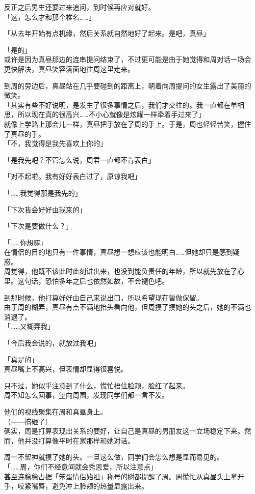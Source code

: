 反正之后男生还要过来追问，到时候再应对就好。\\

「这，怎么才和那个椎名……」

「从去年开始有点机缘，然后关系就自然地好了起来。是吧，真昼」

「是的」\\

或许是因为真昼那边的连串提问结束了，不过更可能是由于她觉得和周对话一场会更快解决，真昼笑容满面地往周这里走来。

到周的旁边后，真昼站在几乎要碰到的距离上，朝着向周提问的女生露出了美丽的微笑。\\

「其实有些不好说明，是发生了很多事情之后，我们才交往的。我一直都在单相思，所以现在真的很高兴……不小心就像是炫耀一样牵着手过来了」\\

就像上学路上那会儿一样，真昼把手放在了周的手上。于是，周也轻轻苦笑，握住了真昼的手。\\

「不，我觉得是我先喜欢上你的」

「是我先吧？不管怎么说，周君一直都不肯表白」

「对不起啦。我有好好表白过了，原谅我吧」

「……我觉得那是我先的」

「下次我会好好由我来的」

「下次是要做什么？」

「……你想嘛」\\

在情侣的目的地只有一件事情，真昼想一想应该也能明白……但她却只是感到疑惑。\\

周觉得，他既不该此时此刻讲出来，也没到能负责任的年龄，所以就先放在了心里。这句话，恐怕多年之后也依然如故，不会褪色吧。

到那时候，他打算好好由自己来说出口，所以希望现在暂做保留。\\

由于周的糊弄，真昼有点不满地抬头看向他，但周摸了摸她的头之后，她的不满也消退了。\\

「……又糊弄我」

「今后我会说的，就放过我吧」

「真是的」\\

真昼嘴上不高兴，但表情却显得很喜悦。

只不过，她似乎注意到了什么，慌忙捂住脸颊，脸红了起来。\\

周不知怎么回事，望向周围，发现同学们都一言不发。

他们的视线聚集在周和真昼身上。\\

（——搞砸了）\\

确实，周是打算表现出关系的要好，让自己是真昼的男朋友这一立场稳定下来。然而，他并没打算像平时在家那样和她对话。

周一不留神就摸了她的头。一旦这么做，同学们会怎么想是显而易见的。\\

「……周，你们不经意间就会秀恩爱，所以注意点」\\

甚至连稳稳占据「笨蛋情侣始祖」称号的树都提醒了周。周慌忙从真昼头上拿开手，咬紧嘴唇，避免冲上脸颊的热量显露出来。
